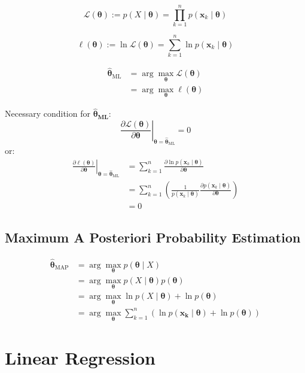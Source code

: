\documentclass{article}
\begin{document}
\begin{multicols}{2}
\[\mathcal{L}(\symbf{\theta}) := p(X \mid \symbf{\theta}) = \prod_{k=1}^{n} p(\symbf{x}_k \mid \symbf{\theta})\]

\[\ell(\symbf{\theta}) := \ln \mathcal{L}(\symbf{\theta}) = \sum_{k=1}^n \ln p(\symbf{x}_k \mid \symbf{\theta})\]

\[\begin{split}
	\symbf{\hat \theta}_{\text{ML}} &= \arg\max_{\symbf{\theta}} \mathcal{L}(\symbf{\theta}) \\
	&= \arg\max_{\symbf{\theta}} \ell(\symbf{\theta})
\end{split}\]

Necessary condition for $\symbf{\hat \theta_{\text{ML}}}$:
\[\left. \frac{\partial \mathcal{L}(\symbf{\theta})}{\partial \symbf{\theta}} \right|_{\symbf{\theta} = \symbf{\hat \theta}_{\text{ML}}} = 0\]
or:
\[\begin{split}
	\left. \frac{\partial \ell(\symbf{\theta})}{\partial \symbf{\theta}} \right|_{\symbf{\theta} = \symbf{\hat \theta}_{\text{ML}}} &= \sum_{k=1}^n \frac{\partial \ln p(\symbf{x}_k \mid \symbf{\theta})}{\partial \symbf{\theta}} \\
	&= \sum_{k=1}^n \left( \frac{1}{p(\symbf{x}_k \mid \symbf{\theta})} \frac{\partial p(\symbf{x}_k \mid \symbf{\theta})}{\partial \symbf{\theta}} \right) \\
	&= 0
\end{split}\]

\subsection{Maximum A Posteriori Probability Estimation}

\[\begin{split}
	\symbf{\hat \theta}_{\text{MAP}} &= \arg\max_{\symbf{\theta}} p(\symbf{\theta} \mid X) \\
	&= \arg\max_{\symbf{\theta}} p(X \mid \symbf{\theta}) p(\symbf{\theta}) \\
	&= \arg\max_{\symbf{\theta}} \ln p(X \mid \symbf{\theta}) + \ln p(\symbf{\theta}) \\
	&= \arg\max_{\symbf{\theta}} \sum_{k=1}^n \left( \ln p(\symbf{x_k} \mid \symbf{\theta}) + \ln p(\symbf{\theta}) \right)
\end{split}\]


\section{Linear Regression}


\end{multicols}
\end{document}

